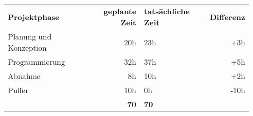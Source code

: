 

\begin{tabular}{lrlr}
\rowcolor{heading}\textbf{Projektphase} & \textbf{geplante Zeit} & \textbf{tatsächliche Zeit} & \textbf{Differenz} \\
Planung und Konzeption & 20h & 23h & +3h \\
\rowcolor{odd} Programmierung & 32h & 37h & +5h \\
Abnahme & 8h & 10h & +2h \\
\rowcolor{odd} Puffer & 10h & 0h & -10h \\
\hline
\hline
\rowcolor{heading}\textbf{} & \textbf{70} & \textbf{70} & \textbf{} \\
\end{tabular}
